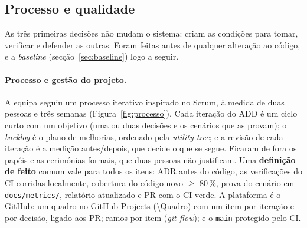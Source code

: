 \subsection{Processo e qualidade}
\label{sec:processo}

As três primeiras decisões não mudam o sistema: criam as condições para tomar, verificar e defender as outras.
Foram feitas antes de qualquer alteração ao código, e a \emph{baseline} (secção~\ref{sec:baseline}) logo a seguir.

\paragraph{Processo e gestão do projeto.}
A equipa seguiu um processo iterativo inspirado no Scrum, à medida de duas pessoas e três semanas
(Figura~\ref{fig:processo}). Cada iteração do ADD é um ciclo curto com um objetivo (uma ou duas decisões e os
cenários que as provam); o \emph{backlog} é o plano de melhorias, ordenado pela \emph{utility tree}; e a revisão de
cada iteração é a medição antes/depois, que decide o que se segue. Ficaram de fora os papéis e as cerimónias
formais, que duas pessoas não justificam. Uma \textbf{definição de feito} comum vale para todos os itens: ADR antes
do código, as verificações do CI corridas localmente, cobertura do código novo $\ge$ 80\,\%, prova do cenário em
\texttt{docs/metrics/}, relatório atualizado e PR com o CI verde. A plataforma é o GitHub: um quadro no GitHub
Projects (\url{\Quadro}) com um item por iteração e por decisão, ligado aos PR; ramos por item (\emph{git-flow}); e o
\texttt{main} protegido pelo CI.

